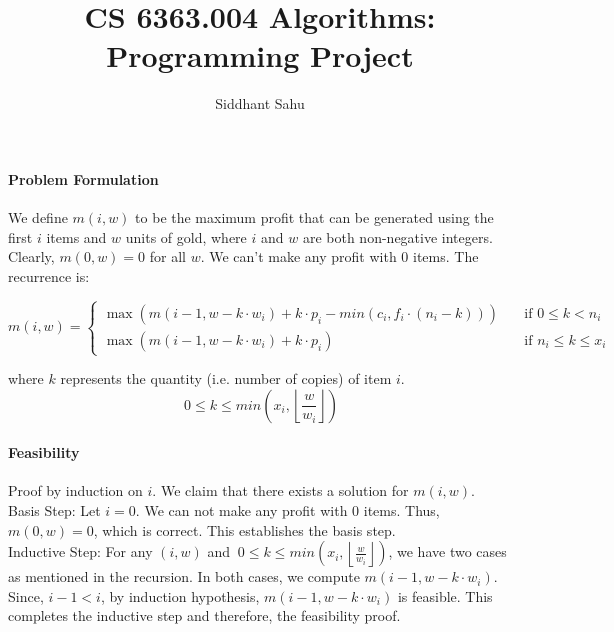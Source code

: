 \documentclass{article}
\title{CS 6363.004 Algorithms: Programming Project}
\author{Siddhant Sahu}
\begin{document}
\maketitle

\paragraph{Problem Formulation}
We define $m(i, w)$ to be the maximum profit that can be generated using the first $i$ items and $w$ units of gold, where $i$ and $w$ are both non-negative integers. Clearly, $m(0, w) = 0$ for all $w$. We can't make any profit with 0 items. The recurrence is:

\[ m(i, w) =
\begin{cases}
\max (m(i-1, w-k \cdot w_i) + k \cdot p_i - min(c_i, f_i \cdot (n_i - k)))       & \quad \text{if } 0 \leq k < n_i\\
\max (m(i-1, w-k \cdot w_i) + k \cdot p_i)  & \quad \text{if } n_i \leq k \leq x_i
\end{cases}
\]

where $k$ represents the quantity (i.e. number of copies) of item $i$.
$$\ 0 \leq k \leq min\left(x_i, \left\lfloor\frac{w}{w_i}\right\rfloor\right)$$

\paragraph{Feasibility}
Proof by induction on $i$. We claim that there exists a solution for $m(i, w)$.\\
Basis Step: Let $i = 0$. We can not make any profit with 0 items. Thus, $m(0, w) = 0$, which is correct. This establishes the basis step.\\
Inductive Step: For any $(i, w)$ and $\ 0 \leq k \leq min\left(x_i, \left\lfloor\frac{w}{w_i}\right\rfloor\right)$, we have two cases as mentioned in the recursion. In both cases, we compute $m(i-1, w-k \cdot w_i)$. Since, $i-1 < i$, by induction hypothesis, $m(i-1, w-k \cdot w_i)$ is feasible. This completes the inductive step and therefore, the feasibility proof.
\end{document}
